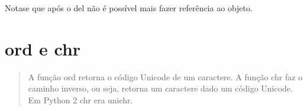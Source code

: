 \documentclass[letterpaper,10pt,brazil]{sphinxmanual}
\begin{document}
\begin{sphinxVerbatim}[commandchars=\\\{\}]
\end{sphinxVerbatim}

\begin{sphinxVerbatim}[commandchars=\\\{\}]
    
  
\end{sphinxVerbatim}

\begin{sphinxVerbatim}[commandchars=\\\{\}]
\end{sphinxVerbatim}

\begin{sphinxVerbatim}[commandchars=\\\{\}]
   
  
\end{sphinxVerbatim}

\begin{sphinxVerbatim}[commandchars=\\\{\}]
\end{sphinxVerbatim}

Nota\sphinxhyphen{}se que após o del não é possível mais fazer referência ao objeto.


\section{ord e chr}
\label{\detokenize{content/built-ins:ord-e-chr}}\begin{quote}

A função ord retorna o código Unicode de um caractere.
A função chr faz o caminho inverso, ou seja, retorna um caractere dado um código Unicode. Em Python 2 chr era unichr.
\end{quote}

\begin{sphinxVerbatim}[commandchars=\\\{\}]
  
\end{sphinxVerbatim}
\end{document}
